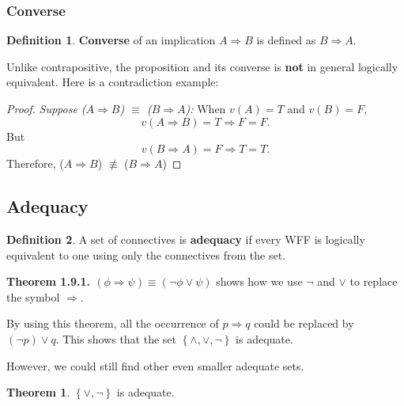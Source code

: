 \documentclass[11pt]{article}
\theoremstyle{definition}
\newtheorem{defn}{Definition}[subsection]
\newtheorem{theorem}{Theorem}[subsection]
\begin{document}
\subsubsection{Converse}
\begin{shaded}
    \begin{defn}
        \textbf{Converse} of an implication $A \Rightarrow B$ is defined as $ B \Rightarrow A$. 
    \end{defn}
\end{shaded}
Unlike contrapositive, the proposition and its converse is \textbf{not} in general logically equivalent. Here is a contradiction example:
\begin{proof}
    \textit{Suppose ($A \Rightarrow B$) $\equiv$ ($B \Rightarrow A$):}
    When $v(A)=T$ and $v(B)=F$,
    \begin{equation}
        v(A \Rightarrow B) = T \Rightarrow F = F.
    \end{equation}
    But
    \begin{equation}
        v(B \Rightarrow A) = F \Rightarrow T = T.
    \end{equation}
    Therefore,
    ($A \Rightarrow B$) $\not \equiv$ ($B \Rightarrow A$)
\end{proof}

\subsection{Adequacy}
\begin{shaded}
    \begin{defn}
        A set of connectives is \textbf{adequacy} if every WFF is logically equivalent to one using only the connectives from the set.
    \end{defn}
\end{shaded}
\textbf{Theorem 1.9.1. $            (\phi \Rightarrow \psi) \equiv (\neg \phi \vee \psi)$} shows how we use $\neg$ and $\vee$ to replace the symbol $\Rightarrow$.

By using this theorem, all the occurrence of $p \Rightarrow q$ could be replaced by $(\neg p) \vee q$. This shows that the set $\left\{ \wedge,\vee,\neg \right\}$ is adequate.

However, we could still find other even smaller adequate sets.

\begin{shaded}
    \begin{theorem}
        $\left\{ \vee, \neg \right\}$ is adequate.
    \end{theorem}
\end{shaded}
\end{document}
